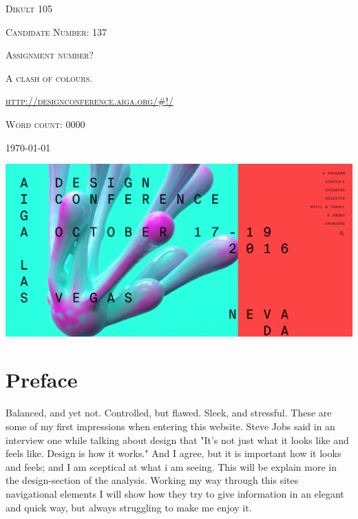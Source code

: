 \documentclass{article}
\begin{document}
	\begin{titlepage} 
		\centering
		{\scshape\Large Dikult 105\par}
		\vspace{2em}
		{\scshape\large Candidate Number: 137\par}
		\vspace{6em}
		{\scshape\Large Assignment number?\par}
		{\scshape\LARGE A clash of colours.\par}
		\vspace{1em}
		{\scshape\url{http://designconference.aiga.org/#!/}\par}
		\vfill
		{\scshape Word count: 0000\par}
		\vspace{3em}
		\large\today
	\end{titlepage}
	{\centering
        \includegraphics[width=\textwidth,height=\textheight,keepaspectratio]{frontpage}
    }
    \vspace{5em}
	\section{Preface}
	    Balanced, and yet not. Controlled, but flawed. Sleek, and stressful. These are some of my first impressions when entering this website. Steve Jobs said in an interview one while talking about design that "It's not just what it looks like and feels like. Design is how it works."\citep*{SteveJobsQuote} And I agree, but it is important how it looks and feels; and I am sceptical at what i am seeing. This will be explain more in the design-section of the analysis. Working my way through this sites navigational elements I will show how they try to give information in an elegant and quick way, but always struggling to make me enjoy it.
\end{document}
